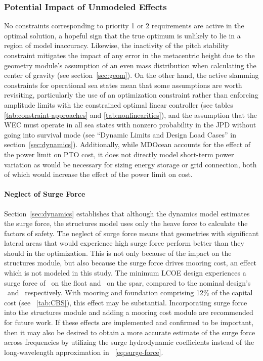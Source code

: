 \subsubsection{Potential Impact of Unmodeled Effects}
No constraints corresponding to priority 1 or 2 requirements are active in the optimal solution, %
a hopeful sign that the true optimum is unlikely to lie in a region of model inaccuracy.
Likewise, the inactivity of the pitch stability constraint mitigates the impact of any error in the metacentric height due to the geometry module's assumption of an even mass distribution when calculating the center of gravity (see section~\ref{sec:geom}).
On the other hand, the active slamming constraints for operational sea states mean that some assumptions are worth revisiting, particularly the use of an optimization constraint rather than enforcing amplitude limits with the constrained optimal linear controller (see tables \ref{tab:constraint-approaches} and \ref{tab:nonlinearities}), and the assumption that the WEC must operate in all sea states with nonzero probability in the JPD without going into survival mode (see ``Dynamic Limits and Design Load Cases'' in section~\ref{sec:dynamics}).
Additionally, while MDOcean accounts for the effect of the power limit on PTO cost, it does not directly model short-term power variation as would be necessary for sizing energy storage or grid connection, both of which would increase the effect of the power limit on cost.

\paragraph{Neglect of Surge Force}
Section~\ref{sec:dynamics} establishes that although the dynamics model estimates the surge force, the structures model uses only the heave force to calculate the factors of safety.
The neglect of surge force means that geometries with significant lateral areas that would experience high surge force perform better than they should in the optimization.
This is not only because of the impact on the structures module, but also because the surge force drives mooring cost, an effect which is not modeled in this study.
The minimum LCOE design experiences a surge force of \surgeForceFloatAtMinLCOE~on the float and \surgeForceSparAtMinLCOE~on the spar, compared to the nominal design's \surgeForceFloatNominal~and \surgeForceSparNominal~respectively.
With mooring and foundation comprising 12\% of the capital cost (see \tableautorefname~\ref{tab:CBS}), this effect may be substantial.
Incorporating surge force into the structures module and adding a mooring cost module are recommended for future work.
If these effects are implemented and confirmed to be important, then it may also be desired to obtain a more accurate estimate of the surge force across frequencies by utilizing the surge hydrodynamic coefficients instead of the long-wavelength approximation in \equationautorefname~\ref{eq:surge-force}. 

